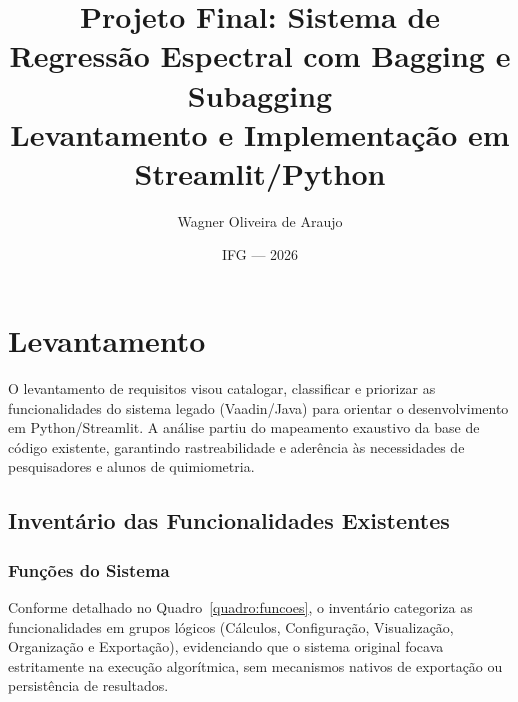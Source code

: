 \documentclass[12pt,a4paper]{article}
\begin{document}
\title{\textbf{Projeto Final: Sistema de Regressão Espectral com Bagging e Subagging}\\
\small Levantamento e Implementação em Streamlit/Python}
\author{Wagner Oliveira de Araujo}
\date{IFG --- 2026}
\maketitle
\thispagestyle{empty}

\newpage
\tableofcontents
\newpage

\section{Levantamento}

O levantamento de requisitos visou catalogar, classificar e priorizar as funcionalidades do sistema legado (Vaadin/Java) para orientar o desenvolvimento em Python/Streamlit. A análise partiu do mapeamento exaustivo da base de código existente, garantindo rastreabilidade e aderência às necessidades de pesquisadores e alunos de quimiometria.

\subsection{Inventário das Funcionalidades Existentes}

\subsubsection{Funções do Sistema}

Conforme detalhado no Quadro~\ref{quadro:funcoes}, o inventário categoriza as funcionalidades em grupos lógicos (Cálculos, Configuração, Visualização, Organização e Exportação), evidenciando que o sistema original focava estritamente na execução algorítmica, sem mecanismos nativos de exportação ou persistência de resultados.
\end{document}
